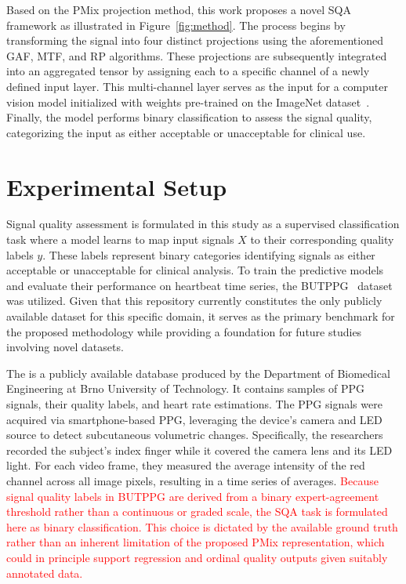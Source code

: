 \documentclass[final,3p,times,twocolumn]{elsarticle}
\newcommand{\red}[1]{\textcolor{red}{#1}}
\begin{document}
Based on the \gls{PMix} projection method, this work proposes a novel \gls{SQA} framework as illustrated in Figure~\ref{fig:method}. The process begins by transforming the signal into four distinct projections using the aforementioned \gls{GAF}, \gls{MTF}, and \gls{RP} algorithms. These projections are subsequently integrated into an aggregated tensor by assigning each to a specific channel of a newly defined input layer. This multi-channel layer serves as the input for a computer vision model initialized with weights pre-trained on the ImageNet dataset~\cite{ImageNet}. Finally, the model performs binary classification to assess the signal quality, categorizing the input as either acceptable or unacceptable for clinical use.










\section{Experimental Setup} \label{sec:setup}


Signal quality assessment is formulated in this study as a supervised classification task where a model learns to map input signals $X$ to their corresponding quality labels $y$.
These labels represent binary categories identifying signals as either acceptable or unacceptable for clinical analysis.
To train the predictive models and evaluate their performance on heartbeat time series, the \gls{BUTPPG}~\cite{butppg} dataset was utilized.
Given that this repository currently constitutes the only publicly available dataset for this specific domain, it serves as the primary benchmark for the proposed methodology while providing a foundation for future studies involving novel datasets.


The  is a publicly available database produced by the Department of Biomedical Engineering at Brno University of Technology. It contains samples of \gls{PPG} signals, their quality labels, and heart rate estimations.
The \gls{PPG} signals were acquired via smartphone-based \gls{PPG}, leveraging the device's camera and \gls{LED} source to detect subcutaneous volumetric changes.
Specifically, the researchers recorded the subject's index finger while it covered the camera lens and its \gls{LED} light. For each video frame, they measured the average intensity of the red channel across all image pixels, resulting in a time series of averages. 
\red{Because signal quality labels in \gls{BUTPPG} are derived from a binary expert-agreement threshold rather than a continuous or graded scale, the \gls{SQA} task is formulated here as binary classification. This choice is dictated by the available ground truth rather than an inherent limitation of the proposed \gls{PMix} representation, which could in principle support regression and ordinal quality outputs given suitably annotated data.}
\end{document}
